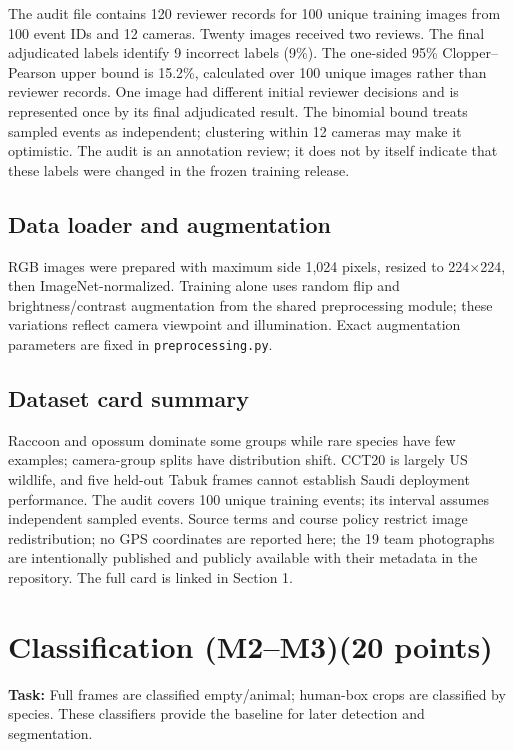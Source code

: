 \documentclass[11pt,a4paper]{article}
\newcommand{\pts}[1]{\texorpdfstring{\hfill{\normalsize\mdseries(#1 points)}}{}}
\begin{document}
\smallskip
The audit file contains 120 reviewer records for 100 unique training images from 100 event IDs and 12 cameras. Twenty images received two reviews. The final adjudicated labels identify 9 incorrect labels (9\%). The one-sided 95\% Clopper--Pearson upper bound is 15.2\%, calculated over 100 unique images rather than reviewer records. One image had different initial reviewer decisions and is represented once by its final adjudicated result. The binomial bound treats sampled events as independent; clustering within 12 cameras may make it optimistic. The audit is an annotation review; it does not by itself indicate that these labels were changed in the frozen training release.

\subsection{Data loader and augmentation}

RGB images were prepared with maximum side 1,024 pixels, resized to 224$\times$224, then ImageNet-normalized. Training alone uses random flip and brightness/contrast augmentation from the shared preprocessing module; these variations reflect camera viewpoint and illumination. Exact augmentation parameters are fixed in \texttt{preprocessing.py}.

\subsection{Dataset card summary}

Raccoon and opossum dominate some groups while rare species have few examples; camera-group splits have distribution shift. CCT20 is largely US wildlife, and five held-out Tabuk frames cannot establish Saudi deployment performance. The audit covers 100 unique training events; its interval assumes independent sampled events. Source terms and course policy restrict image redistribution; no GPS coordinates are reported here; the 19 team photographs are intentionally published and publicly available with their metadata in the repository. The full card is linked in Section 1.

\section{Classification (M2--M3)\pts{20}}

\textbf{Task:} Full frames are classified empty/animal; human-box crops are classified by species. These classifiers provide the baseline for later detection and segmentation.
\end{document}
